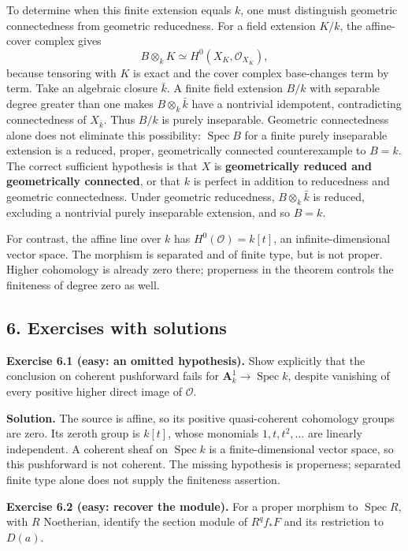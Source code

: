 \documentclass[11pt]{article}
\begin{document}
To determine when this finite extension equals \(k\), one must
distinguish geometric connectedness from geometric reducedness. For a
field extension \(K/k\), the affine-cover complex gives \[
B\otimes_k K\simeq H^0(X_K,\mathcal O_{X_K}),
\] because tensoring with \(K\) is exact and the cover complex
base-changes term by term. Take an algebraic closure \(\bar k\). A
finite field extension \(B/k\) with separable degree greater than one
makes \(B\otimes_k\bar k\) have a nontrivial idempotent, contradicting
connectedness of \(X_{\bar k}\). Thus \(B/k\) is purely inseparable.
Geometric connectedness alone does not eliminate this possibility:
\(\operatorname{Spec}B\) for a finite purely inseparable extension is a
reduced, proper, geometrically connected counterexample to \(B=k\). The
correct sufficient hypothesis is that \(X\) is \textbf{geometrically
reduced and geometrically connected}, or that \(k\) is perfect in
addition to reducedness and geometric connectedness. Under geometric
reducedness, \(B\otimes_k\bar k\) is reduced, excluding a nontrivial
purely inseparable extension, and so \(B=k\).

For contrast, the affine line over \(k\) has \(H^0(\mathcal O)=k[t]\),
an infinite-dimensional vector space. The morphism is separated and of
finite type, but is not proper. Higher cohomology is already zero there;
properness in the theorem controls the finiteness of degree zero as
well.

\subsection{6. Exercises with solutions}\label{exercises-with-solutions}

\textbf{Exercise 6.1 (easy: an omitted hypothesis).} Show explicitly
that the conclusion on coherent pushforward fails for
\(\mathbf A_k^1\to\operatorname{Spec}k\), despite vanishing of every
positive higher direct image of \(\mathcal O\).

\textbf{Solution.} The source is affine, so its positive quasi-coherent
cohomology groups are zero. Its zeroth group is \(k[t]\), whose
monomials \(1,t,t^2,\ldots\) are linearly independent. A coherent sheaf
on \(\operatorname{Spec}k\) is a finite-dimensional vector space, so
this pushforward is not coherent. The missing hypothesis is properness;
separated finite type alone does not supply the finiteness assertion.

\textbf{Exercise 6.2 (easy: recover the module).} For a proper morphism
to \(\operatorname{Spec}R\), with \(R\) Noetherian, identify the section
module of \(R^qf_*F\) and its restriction to \(D(a)\).
\end{document}
